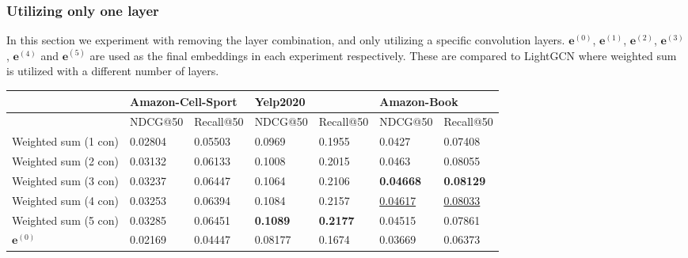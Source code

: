 \subsubsection{Utilizing only one layer}
In this section we experiment with removing the layer combination, and only utilizing a specific convolution layers.
$\mathbf{e}^{(0)}$, $\mathbf{e}^{(1)}$, $\mathbf{e}^{(2)}$, $\mathbf{e}^{(3)}$, $\mathbf{e}^{(4)}$ and $\mathbf{e}^{(5)}$ are used as the final embeddings in each experiment respectively.
These are compared to LightGCN where weighted sum is utilized with a different number of layers.
\begin{table}[]
    \centering
    \begin{tabular}{|l|l|l|l|l|l|l|}
        \hline
                             & \multicolumn{2}{l|}{Amazon-Cell-Sport} & \multicolumn{2}{l|}{Yelp2020} & \multicolumn{2}{l|}{Amazon-Book}                                                                 \\ \hline
                             & NDCG@50                                & Recall@50                     & NDCG@50                          & Recall@50         & NDCG@50             & Recall@50           \\ \hline
        Weighted sum (1 con) & 0.02804                                & 0.05503                       & 0.0969                           & 0.1955            & 0.0427              & 0.07408             \\ \hline
        Weighted sum (2 con) & 0.03132                                & 0.06133                       & 0.1008                           & 0.2015            & 0.0463              & 0.08055             \\ \hline
        Weighted sum (3 con) & 0.03237                                & 0.06447                       & 0.1064                           & 0.2106            & \textbf{0.04668}    & \textbf{0.08129}    \\ \hline
        Weighted sum (4 con) & 0.03253                                & 0.06394                       & 0.1084                           & 0.2157            & \underline{0.04617} & \underline{0.08033} \\ \hline
        Weighted sum (5 con) & 0.03285                                & 0.06451                       & \textbf{0.1089}                  & \textbf{0.2177}   & 0.04515             & 0.07861             \\ \hline
        $\mathbf{e}^{(0)}$   & 0.02169                                & 0.04447                       & 0.08177                          & 0.1674            & 0.03669             & 0.06373             \\ \hline

\end{tabular}
\end{table}
